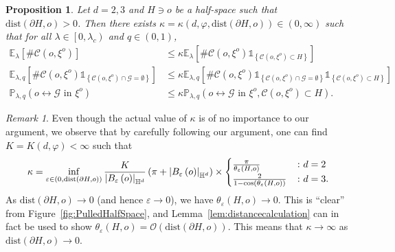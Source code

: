 \documentclass[10pt,a4paper,dvipsnames]{article}
\newtheorem{prop}[theorem]{Proposition}
\theoremstyle{definition}
\theoremstyle{remark}
\newtheorem{remark}[theorem]{Remark}
\newcommand{\plaq}{\mathbb{P}_{\lambda,q}}
\newcommand{\ela}{\mathbb E_{\lambda}}
\newcommand{\elaq}{\mathbb E_{\lambda,q}}
\newcommand{\HypDim}{{\mathbb{H}^d}}
\newcommand{\C}{\mathscr {C}}
\newcommand{\LandauBigO}[1]{\mathcal{O}\left(#1\right)}
\newcommand{\Gcal}{\mathcal{G}}
\newcommand{\conn}[3]{#1 \longleftrightarrow #2\textrm { in } #3}
\newcommand{\Id}{\mathds 1}
\DeclarePairedDelimiter\abs{\lvert}{\rvert}
\newcommand{\habsd}[1]{\abs*{#1}_\HypDim}
\newcommand{\dist}[1]{\mathrm{dist}\left(#1\right)}
\newcommand{\orig}{o}
\newcommand{\connf}{\varphi}
\numberwithin{equation}{section}
\begin{document}
\begin{prop}\label{prop:BoundHalf-SpaceSusceptMagnet}
    Let $d=2,3$ and $H\ni \orig$ be a half-space such that $\dist{\partial H,\orig}>0$. Then there exists $\kappa=\kappa\left(d,\connf,\dist{\partial H,\orig}\right)\in\left(0,\infty\right)$ such that for all $\lambda\in\left[0,\lambda_c\right)$ and $q\in\left(0,1\right)$,
    \begin{align}
        \ela\left[\#\C\left(\orig,\xi^{\orig}\right)\right] &\leq \kappa\ela\left[\#\C\left(\orig,\xi^{\orig}\right) \Id_{\left\{\C\left(\orig,\xi^{\orig}\right)\subset H\right\}}\right]\\
        \elaq\left[\#\C\left(\orig,\xi^{\orig}\right)\Id_{\left\{\C\left(\orig,\xi^{\orig}\right)\cap \Gcal = \emptyset\right\}}\right] &\leq \kappa\elaq\left[\#\C\left(\orig,\xi^{\orig}\right)\Id_{\left\{\C\left(\orig,\xi^{\orig}\right)\cap \Gcal = \emptyset\right\}} \Id_{\left\{\C\left(\orig,\xi^{\orig}\right)\subset H\right\}}\right]\\
        \plaq\left(\conn{\orig}{\Gcal}{\xi^\orig}\right) &\leq \kappa\plaq\left(\conn{\orig}{\Gcal}{\xi^\orig},\C\left(\orig,\xi^{\orig}\right)\subset H\right).
    \end{align}
\end{prop}

\begin{remark}
    Even though the actual value of $\kappa$ is of no importance to our argument, we observe that by carefully following our argument, one can find $K = K\left(d,\connf\right)<\infty$ such that
    \begin{equation}
        \kappa = \inf_{\varepsilon\in\left(0,\dist{\partial H,\orig}\right)}\frac{K}{\habsd{B_\varepsilon\left(\orig\right)}}\left(\pi + \habsd{B_\varepsilon\left(\orig\right)}\right) \times \begin{cases}
            \frac{\pi}{\theta_\varepsilon\left( H,\orig\right)} &\colon d=2\\
            \frac{2}{1-\cos\left(\theta_\varepsilon\left( H,\orig\right)\right)}&\colon d=3.
        \end{cases}
    \end{equation}
    As $\dist{\partial H,\orig}\to 0$ (and hence $\varepsilon\to 0$), we have $\theta_\varepsilon\left(H,\orig\right)\to 0$. This is ``clear'' from Figure~\ref{fig:PulledHalfSpace}, and Lemma~\ref{lem:distancecalculation} can in fact be used to show $\theta_\varepsilon\left(H,\orig\right) = \LandauBigO{\dist{\partial H, \orig}}$. This means that $\kappa\to\infty$ as $\dist{\partial H,\orig}\to 0$.
\end{remark}
\end{document}
